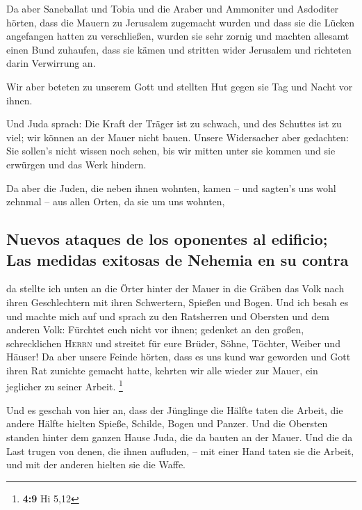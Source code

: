 Da aber Saneballat und Tobia und die Araber und Ammoniter
und Asdoditer hörten, dass die Mauern zu Jerusalem zugemacht wurden und
dass sie die Lücken angefangen hatten zu verschließen, wurden sie sehr
zornig  und machten allesamt einen Bund zuhaufen, dass sie
kämen und stritten wider Jerusalem und richteten darin Verwirrung an.

 Wir aber beteten zu unserem Gott und stellten Hut gegen
sie Tag und Nacht vor ihnen.

 Und Juda sprach: Die Kraft der Träger ist zu schwach, und
des Schuttes ist zu viel; wir können an der Mauer nicht bauen.
 Unsere Widersacher aber gedachten: Sie sollen's nicht
wissen noch sehen, bis wir mitten unter sie kommen und sie erwürgen und
das Werk hindern.

 Da aber die Juden, die neben ihnen wohnten, kamen -- und
sagten's uns wohl zehnmal -- aus allen Orten, da sie um uns wohnten,

\hypertarget{nuevos-ataques-de-los-oponentes-al-edificio-las-medidas-exitosas-de-nehemia-en-su-contra}{%
\subsection{Nuevos ataques de los oponentes al edificio; Las medidas
exitosas de Nehemia en su
contra}\label{nuevos-ataques-de-los-oponentes-al-edificio-las-medidas-exitosas-de-nehemia-en-su-contra}}

 da stellte ich unten an die Örter hinter der Mauer in die
Gräben das Volk nach ihren Geschlechtern mit ihren Schwertern, Spießen
und Bogen.  Und ich besah es und machte mich auf und
sprach zu den Ratsherren und Obersten und dem anderen Volk: Fürchtet
euch nicht vor ihnen; gedenket an den großen, schrecklichen
\textsc{Herrn} und streitet für eure Brüder, Söhne, Töchter, Weiber und
Häuser!  Da aber unsere Feinde hörten, dass es uns kund
war geworden und Gott ihren Rat zunichte gemacht hatte, kehrten wir alle
wieder zur Mauer, ein jeglicher zu seiner Arbeit. \footnote{\textbf{4:9}
  Hi 5,12}

 Und es geschah von hier an, dass der Jünglinge die
Hälfte taten die Arbeit, die andere Hälfte hielten Spieße, Schilde,
Bogen und Panzer. Und die Obersten standen hinter dem ganzen Hause Juda,
 die da bauten an der Mauer. Und die da Last trugen von
denen, die ihnen aufluden, -- mit einer Hand taten sie die Arbeit, und
mit der anderen hielten sie die Waffe.

